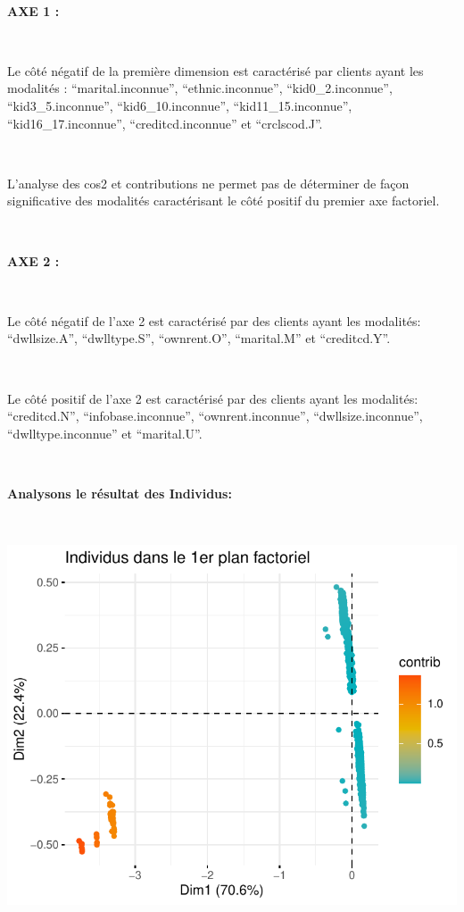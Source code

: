 \documentclass[]{imsart}
\numberwithin{equation}{section}
\theoremstyle{plain}
\begin{document}
~

\textbf{AXE 1 :}

~

Le côté négatif de la première dimension est caractérisé par clients ayant les modalités : ``marital.inconnue'', ``ethnic.inconnue'', ``kid0\_2.inconnue'', ``kid3\_5.inconnue'', ``kid6\_10.inconnue'', ``kid11\_15.inconnue'', ``kid16\_17.inconnue'', ``creditcd.inconnue'' et ``crclscod.J''.

~

L'analyse des cos2 et contributions ne permet pas de déterminer de façon significative des modalités caractérisant le côté positif du premier axe factoriel.

~

\textbf{AXE 2 :}

~

Le côté négatif de l'axe 2 est caractérisé par des clients ayant les modalités: ``dwllsize.A'', ``dwlltype.S'', ``ownrent.O'', ``marital.M'' et ``creditcd.Y''.

~

Le côté positif de l'axe 2 est caractérisé par des clients ayant les modalités: ``creditcd.N'', ``infobase.inconnue'', ``ownrent.inconnue'', ``dwllsize.inconnue'', ``dwlltype.inconnue'' et ``marital.U''.

~

\textbf{Analysons le résultat des Individus:}

~

\begin{flushleft}\includegraphics{Analyse_Exploratoire_Projet_files/figure-latex/unnamed-chunk-34-1} \end{flushleft}
\end{document}
